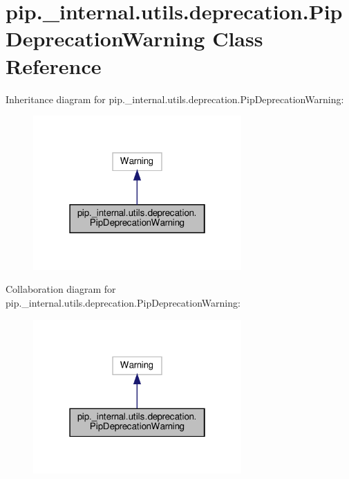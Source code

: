 \hypertarget{classpip_1_1__internal_1_1utils_1_1deprecation_1_1PipDeprecationWarning}{}\section{pip.\+\_\+internal.\+utils.\+deprecation.\+Pip\+Deprecation\+Warning Class Reference}
\label{classpip_1_1__internal_1_1utils_1_1deprecation_1_1PipDeprecationWarning}


Inheritance diagram for pip.\+\_\+internal.\+utils.\+deprecation.\+Pip\+Deprecation\+Warning\+:
\nopagebreak
\begin{figure}[H]
\begin{center}
\leavevmode
\includegraphics[width=226pt]{classpip_1_1__internal_1_1utils_1_1deprecation_1_1PipDeprecationWarning__inherit__graph}
\end{center}
\end{figure}


Collaboration diagram for pip.\+\_\+internal.\+utils.\+deprecation.\+Pip\+Deprecation\+Warning\+:
\nopagebreak
\begin{figure}[H]
\begin{center}
\leavevmode
\includegraphics[width=226pt]{classpip_1_1__internal_1_1utils_1_1deprecation_1_1PipDeprecationWarning__coll__graph}
\end{center}
\end{figure}
